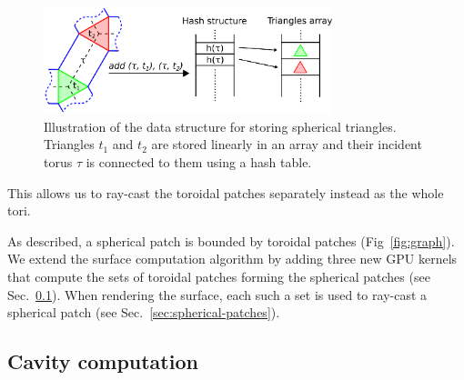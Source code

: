 \begin{figure}[htb]
  \centering
  \includegraphics[width=3.3in]{image/hashing.png}
  \caption{Illustration of the data structure for storing spherical triangles. Triangles $t_1$ and $t_2$ are stored linearly in an array and their incident torus $\tau$ is connected to them using a hash table.}
	\label{fig:hashing41}
\end{figure}

This allows us to ray-cast the toroidal patches separately instead as the whole tori.

As described, a spherical patch is bounded by toroidal patches (Fig~\ref{fig:graph}). 
We extend the surface computation algorithm by adding three new GPU kernels that compute the sets of toroidal patches forming the spherical patches (see Sec.~\ref{sec:graph}).
When rendering the surface, each such a set is used to ray-cast a spherical patch (see Sec.~\ref{sec:spherical-patches}).


\subsection{Cavity computation}
\label{sec:graph}
   
